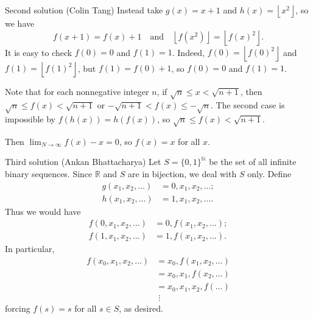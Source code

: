\begin{customenv}{Second solution (Colin Tang)}
    Instead take $g(x)=x+1$ and $h(x)=\left\lfloor x^2\right\rfloor$, so we have \[f(x+1)=f(x)+1\quad\text{and}\quad \left\lfloor f\left(x^2\right)\right\rfloor=\left\lfloor f(x)^2\right\rfloor.\]
    It is easy to check $f(0)=0$ and $f(1)=1$. Indeed, $f(0)=\left\lfloor f(0)^2\right\rfloor$ and $f(1)=\left\lfloor f(1)^2\right\rfloor$, but $f(1)=f(0)+1$, so $f(0)=0$ and $f(1)=1$.

    Note that for each nonnegative integer $n$, if $\sqrt n\le x<\sqrt{n+1}$, then $\sqrt n\le f(x)<\sqrt{n+1}$ or $-\sqrt{n+1}<f(x)\le-\sqrt n$. The second case is impossible by $f(h(x))=h(f(x))$, so $\sqrt n\le f(x)<\sqrt{n+1}$.

    Then $\lim_{N\to\infty}f(x)-x=0$, so $f(x)=x$ for all $x$.
\end{customenv}
\begin{customenv}{Third solution (Ankan Bhattacharya)}
    Let $S=\{0,1\}^{\mathbb N}$ be the set of all infinite binary sequences. Since $\mathbb R$ and $S$ are in bijection, we deal with $S$ only. Define
    \begin{align*}
        g(x_1,x_2,\ldots)&=0,x_1,x_2,\ldots;\\
        h(x_1,x_2,\ldots)&=1,x_1,x_2,\ldots.
    \end{align*}
    Thus we would have
    \begin{align*}
        f(0,x_1,x_2,\ldots)&=0,f(x_1,x_2,\ldots);\\
        f(1,x_1,x_2,\ldots)&=1,f(x_1,x_2,\ldots).
    \end{align*}
    In particular,
    \begin{align*}
        f(x_0,x_1,x_2,\ldots)&=x_0,f(x_1,x_2,\ldots)\\
        &=x_0,x_1,f(x_2,\ldots)\\
        &=x_0,x_1,x_2,f(\ldots)\\
        &\;\vdots
    \end{align*}
    forcing $f(s)=s$ for all $s\in S$, as desired.
\end{customenv}

